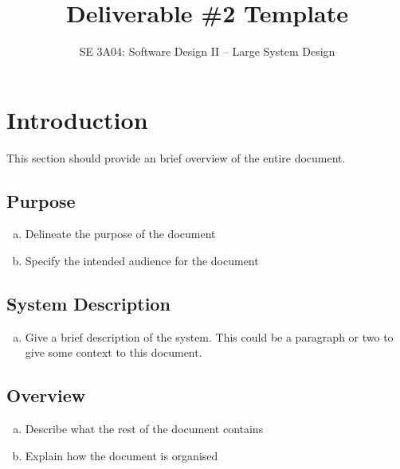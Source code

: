 \documentclass[]{article}
\title{Deliverable \#2 Template}
\author{SE 3A04: Software Design II -- Large System Design}
\date{}
\begin{document}
\maketitle	

\section{Introduction}
\label{sec:introduction}

This section should provide an brief overview of the entire document.

\subsection{Purpose}
\label{sub:purpose}
\begin{enumerate}[a)]
	\item Delineate the purpose of the document
	\item Specify the intended audience for the document
\end{enumerate}

\subsection{System Description}
\label{sub:system_description}
\begin{enumerate}[a)]
	\item Give a brief description of the system. This could be a paragraph or two to give some context to this document.
\end{enumerate}

\subsection{Overview}
\label{sub:overview}
\begin{enumerate}[a)]
	\item Describe what the rest of the document contains 
	\item Explain how the document is organised
\end{enumerate}

\end{document}
